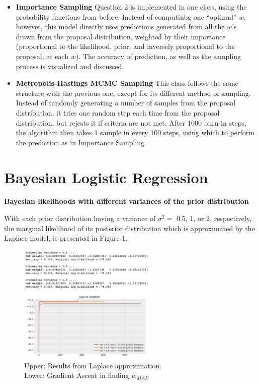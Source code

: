\documentclass{article} %
\begin{document}
\begin{itemize}
  \item \textbf{Importance Sampling}
  Question 2 is implemented in one class, using the probability functions from before. Instead of computinbg one ``optimal'' $w$, however, this model directly uses predictions generated from all the $w$'s drawn from the proposal distribution, weighted by their importance (proportional to the likelihood, prior, and inversely proportional to the proposal, at each $w$). The accuracy of prediction, as well as the sampling process is visualized and discussed.

  \item \textbf{Metropolis-Hastings MCMC Sampling}
  This class follows the same structure with the previous one, except for its different method of sampling. Instead of randomly generating a number of samples from the proposal distribution, it tries one random step each time from the proposal distribution, but rejests it if criteria are not met. After 1000 burn-in steps, the algorithm then takes 1 sample in every 100 steps, using which to perform the prediction as in Importance Sampling.
\end{itemize}



\vspace{0.3cm}
\section*{Bayesian Logistic Regression} %

{\large\textbf{Bayesian likelihoods with different variances of the prior distribution}}

  With each prior distribution having a variance of $\sigma^2 =$ 0.5, 1, or 2, respectively, the marginal likelihood of its posterior distribution which is approximated by the Laplace model, is presented in Figure 1.

  \begin{figure}
    \begin{center}
      \includegraphics[width=0.6\textwidth]{A5_1.png}
    \end{center}
    \caption{Upper: Results from Laplace approximation. \\Lower: Gradient Ascent in finding $w_{MAP}$}
  \end{figure}
\end{document}
